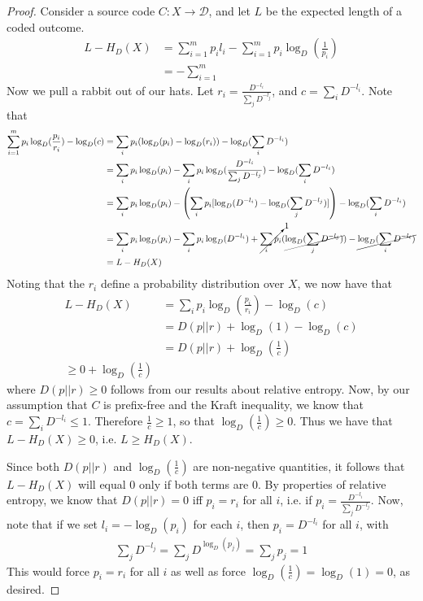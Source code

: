 \begin{proof}
    Consider a source code $C: X \to \mathcal{D}$, and let $L$ be the expected length of a coded outcome. 
    \begin{align}
        L - H_D(X) &= \sum_{i=1}^m p_il_i - \sum_{i=1}^m p_i\log_D(\frac{1}{p_i}) \\
                   &= -\sum_{i=1}^m
    \end{align}
    Now we pull a rabbit out of our hats. Let $r_i = \frac{D^{-l_i}}{\sum_j D^{-l_j}}$, and $c = \sum_i D^{-l_i}$. Note that
    \begin{align}
        \sum_{i=1}^m p_i\log_D(\frac{p_i}{r_i}) - \log_D(c) &= \sum_i p_i(\log_D(p_i) - \log_D(r_i)) - \log_D(\sum_i D^{-l_i}) \\
        &= \sum_i p_i\log_D(p_i) - \sum_i p_i\log_D(\frac{D^{-l_i}}{\sum_j D^{-l_j}}) - \log_D(\sum_i D^{-l_i}) \\
        &= \sum_i p_i \log_D(p_i) - \left( \sum_i p_i[\log_D(D^{-l_i}) - \log_D(\sum_j D^{-l_j})] \right) - \log_D(\sum_i D^{-l_i}) \\
        &= \sum_i p_i \log_D(p_i) - \sum_i p_i \log_D(D^{-l_i}) + \cancelto{1}{\sum_i p_i}(\cancel{\log_D(\sum_j D^{-l_j})}) - \cancel{\log_D(\sum_i D^{-l_i})} \\
        &= L - H_D(X)
    \end{align}
    Noting that the $r_i$ define a probability distribution over $X$, we now have that
    \begin{align}
        L-H_D(X) &= \sum_i p_i \log_D(\frac{p_i}{r_i}) - \log_D(c) \\
                 &= D(p || r) + \log_D(1) - \log_D(c) \\
                 &= D(p || r) + \log_D(\frac{1}{c}) \\
                 \geq 0 + \log_D(\frac{1}{c})
    \end{align}
    where $D(p || r) \geq 0$ follows from our results about relative entropy. Now, by our assumption that $C$ is prefix-free and the Kraft inequality, we know that $c = \sum_i D^{-l_i} \leq 1$. Therefore $\frac{1}{c} \geq 1$, so that $\log_D(\frac{1}{c}) \geq 0$. Thus we have that $L-H_D(X) \geq 0$, i.e. $L \geq H_D(X)$. 

    Since both $D(p || r)$ and $\log_D(\frac{1}{c})$ are non-negative quantities, it follows that $L-H_D(X)$ will equal $0$ only if both terms are $0$. By properties of relative entropy, we know that $D(p || r) =0$ iff $p_i = r_i$ for all $i$, i.e. if $p_i = \frac{D^{-l_i}}{\sum_j D^{-l_j}}$. Now, note that if we set $l_i = -\log_D(p_i)$ for each $i$, then $p_i = D^{-l_i}$ for all $i$, with 
    \begin{align}
        \sum_j D^{-l_j} = \sum_j D^{\log_D(p_j)} = \sum_j p_j = 1
    \end{align}
    This would force $p_i = r_i$ for all $i$ as well as force $\log_D(\frac{1}{c}) = \log_D(1) = 0$, as desired. 
\end{proof}
